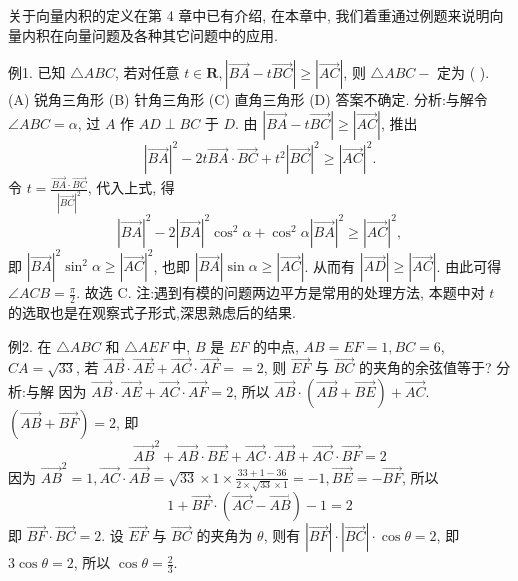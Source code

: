 
关于向量内积的定义在第 4 章中已有介绍, 在本章中, 我们着重通过例题来说明向量内积在向量问题及各种其它问题中的应用.



例1. 已知 $\triangle A B C$, 若对任意 $t \in \mathbf{R},|\overrightarrow{B A}-t \overrightarrow{B C}| \geqslant|\overrightarrow{A C}|$, 则 $\triangle A B C-$ 定为 ( ).
(A) 锐角三角形 (B) 针角三角形 (C) 直角三角形 (D) 答案不确定.
分析:与解令 $\angle A B C=\alpha$, 过 $A$ 作 $A D \perp B C$ 于 $D$. 由 $|\overrightarrow{B A}-t \overrightarrow{B C}| \geqslant |\overrightarrow{A C}|$, 推出
$$
|\overrightarrow{B A}|^2-2 t \overrightarrow{B A} \cdot \overrightarrow{B C}+t^2|\overrightarrow{B C}|^2 \geqslant|\overrightarrow{A C}|^2 .
$$
令 $t=\frac{\overrightarrow{B A} \cdot \overrightarrow{B C}}{|\overrightarrow{B C}|^2}$, 代入上式, 得
$$
|\overrightarrow{B A}|^2-2|\overrightarrow{B A}|^2 \cos ^2 \alpha+\cos ^2 \alpha|\overrightarrow{B A}|^2 \geqslant|\overrightarrow{A C}|^2,
$$
即 $|\overrightarrow{B A}|^2 \sin ^2 \alpha \geqslant|\overrightarrow{A C}|^2$, 也即 $|\overrightarrow{B A}| \sin \alpha \geqslant|\overrightarrow{A C}|$. 从而有 $|\overrightarrow{A D}| \geqslant|\overrightarrow{A C}|$.
由此可得 $\angle A C B=\frac{\pi}{2}$. 故选 C.
注:遇到有模的问题两边平方是常用的处理方法, 本题中对 $t$ 的选取也是在观察式子形式,深思熟虑后的结果.



例2. 在 $\triangle A B C$ 和 $\triangle A E F$ 中, $B$ 是 $E F$ 的中点, $A B=E F=1, B C=6$, $C A=\sqrt{33}$, 若 $\overrightarrow{A B} \cdot \overrightarrow{A E}+\overrightarrow{A C} \cdot \overrightarrow{A F}==2$, 则 $\overrightarrow{E F}$ 与 $\overrightarrow{B C}$ 的夹角的余弦值等于?
分析:与解 因为 $\overrightarrow{A B} \cdot \overrightarrow{A E}+\overrightarrow{A C} \cdot \overrightarrow{A F}=2$, 所以 $\overrightarrow{A B} \cdot(\overrightarrow{A B}+\overrightarrow{B E})+\overrightarrow{A C}$. $(\overrightarrow{A B}+\overrightarrow{B F})=2$, 即
$$
\overrightarrow{A B}^2+\overrightarrow{A B} \cdot \overrightarrow{B E}+\overrightarrow{A C} \cdot \overrightarrow{A B}+\overrightarrow{A C} \cdot \overrightarrow{B F}=2
$$
因为 $\overrightarrow{A B}^2=1, \overrightarrow{A C} \cdot \overrightarrow{A B}=\sqrt{33} \times 1 \times \frac{33+1-36}{2 \times \sqrt{33} \times 1}=-1, \overrightarrow{B E}=-\overrightarrow{B F}$, 所以
$$
1+\overrightarrow{B F} \cdot(\overrightarrow{A C}-\overrightarrow{A B})-1=2
$$
即 $\overrightarrow{B F} \cdot \overrightarrow{B C}=2$.
设 $\overrightarrow{E F}$ 与 $\overrightarrow{B C}$ 的夹角为 $\theta$, 则有 $|\overrightarrow{B F}| \cdot|\overrightarrow{B C}| \cdot \cos \theta=2$, 即 $3 \cos \theta=2$, 所以 $\cos \theta=\frac{2}{3}$.



